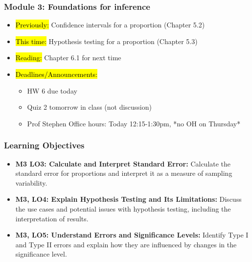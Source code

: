 
\begin{frame}
    \frametitle{Module 3: Foundations for inference}
    \begin{itemize}
        \item \hl{Previously: }Confidence intervals for a proportion (Chapter 5.2)
        \item \hl{This time: }Hypothesis testing for a proportion (Chapter 5.3)
        \item \hl{Reading: }Chapter 6.1 for next time
        \item \hl{Deadlines/Announcements: }
        \begin{itemize}
        \item HW 6 due today
        \item Quiz 2 tomorrow in class (not discussion)
        \item Prof Stephen Office hours: Today 12:15-1:30pm, *no OH on Thursday*
        \end{itemize}
    \end{itemize}
    
\end{frame}

            
\begin{frame}
    \frametitle{Learning Objectives}
    \begin{itemize}
        \item \textbf{M3 LO3: Calculate and Interpret Standard Error:} Calculate the standard error for proportions and interpret it as a measure of sampling variability.
        \item \textbf{M3, LO4: Explain Hypothesis Testing and Its Limitations:} Discuss the use cases and potential issues with hypothesis testing, including the interpretation of results.
        \item \textbf{M3, LO5: Understand Errors and Significance Levels:} Identify Type I and Type II errors and explain how they are influenced by changes in the significance level.
    \end{itemize}
\end{frame}
